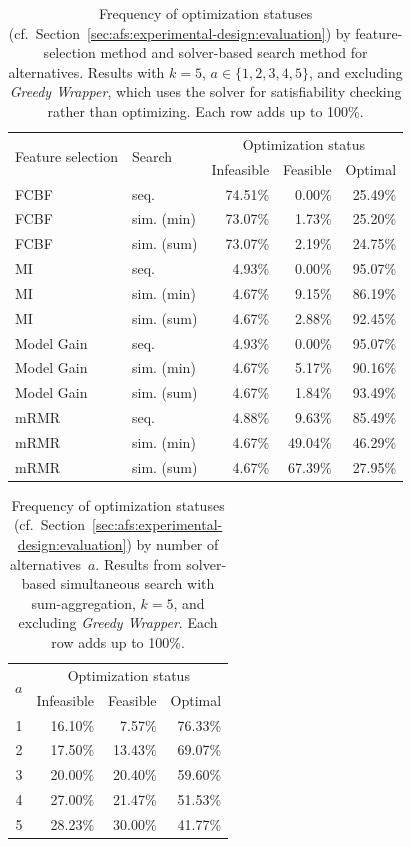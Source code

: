 \documentclass{article}
\theoremstyle{definition}
\begin{document}
\begin{table}[t]
	\centering
	\begin{tabular}{llrrr}
		\toprule
		\multirow{2}{*}{Feature selection} & \multirow{2}{*}{Search} & \multicolumn{3}{c}{Optimization status} \\
		\cmidrule(r){3-5}
		& & Infeasible & Feasible & Optimal \\
		\midrule
		FCBF & seq. & 74.51\% & 0.00\% & 25.49\% \\
		FCBF & sim. (min) & 73.07\% & 1.73\% & 25.20\% \\
		FCBF & sim. (sum) & 73.07\% & 2.19\% & 24.75\% \\
		MI & seq. & 4.93\% & 0.00\% & 95.07\% \\
		MI & sim. (min) & 4.67\% & 9.15\% & 86.19\% \\
		MI & sim. (sum) & 4.67\% & 2.88\% & 92.45\% \\
		Model Gain & seq. & 4.93\% & 0.00\% & 95.07\% \\
		Model Gain & sim. (min) & 4.67\% & 5.17\% & 90.16\% \\
		Model Gain & sim. (sum) & 4.67\% & 1.84\% & 93.49\% \\
		mRMR & seq. & 4.88\% & 9.63\% & 85.49\% \\
		mRMR & sim. (min) & 4.67\% & 49.04\% & 46.29\% \\
		mRMR & sim. (sum) & 4.67\% & 67.39\% & 27.95\% \\
		\bottomrule
	\end{tabular}
	\caption{
		Frequency of optimization statuses (cf.~Section~\ref{sec:afs:experimental-design:evaluation}) by feature-selection method and solver-based search method for alternatives.
		Results with $k=5$, $a \in \{1,2,3,4,5\}$, and excluding \emph{Greedy Wrapper}, which uses the solver for satisfiability checking rather than optimizing.
		Each row adds up to 100\%.
	}
	\label{tab:afs:impact-search-fs-method-optimization-status}
\end{table}

\begin{table}[t]
	\centering
	\begin{tabular}{rrrr}
		\toprule
		\multirow{2}{*}{$a$} & \multicolumn{3}{c}{Optimization status} \\
		\cmidrule(r){2-4}
		& Infeasible & Feasible & Optimal \\
		\midrule
		1 & 16.10\% & 7.57\% & 76.33\% \\
		2 & 17.50\% & 13.43\% & 69.07\% \\
		3 & 20.00\% & 20.40\% & 59.60\% \\
		4 & 27.00\% & 21.47\% & 51.53\% \\
		5 & 28.23\% & 30.00\% & 41.77\% \\
		\bottomrule
	\end{tabular}
	\caption{
		Frequency of optimization statuses (cf.~Section~\ref{sec:afs:experimental-design:evaluation}) by number of alternatives~$a$.
		Results from solver-based simultaneous search with sum-aggregation, $k=5$, and excluding \emph{Greedy Wrapper}.
		Each row adds up to 100\%.
	}
	\label{tab:afs:impact-num-alternatives-optimization-status}
\end{table}
\end{document}
